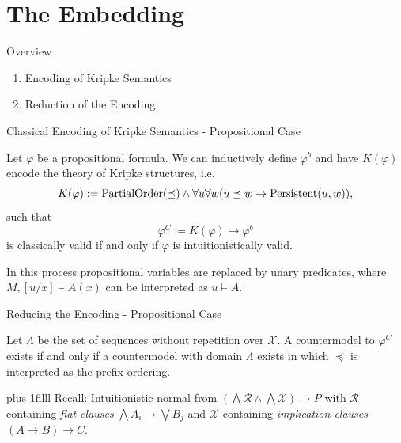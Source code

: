 \documentclass{cubeamer}
\newcommand{\btVFill}{\vskip0pt plus 1filll}
\begin{document}
	
	\section{The Embedding}
	
	\begin{frame}{Overview}
		\begin{enumerate}
			\item Encoding of Kripke Semantics
			\item Reduction of the Encoding
		\end{enumerate}
	\end{frame}

	\begin{frame}{Classical Encoding of Kripke Semantics - Propositional Case}
		\begin{lemma}
			Let $\varphi$ be a propositional formula.
		 	We can inductively define $\varphi^{b}$ 
			and have $K(\varphi)$ encode the theory of Kripke structures, i.e.
			\[K(\varphi) := \text{\normalfont PartialOrder}(\preceq)\wedge\forall u\forall w(u\preceq w\to \text{\normalfont Persistent}(u, w)),\]
			such that
			\[\varphi^{C} := K(\varphi)\to \varphi^{b}\]
		    is classically valid if and only if $\varphi$ is intuitionistically valid.
		\end{lemma}
		In this process propositional variables are replaced by unary predicates, where $M, [u/x]\models A(x)$ can be interpreted as $u\models A$.
	\end{frame}
	
	\begin{frame}{Reducing the Encoding - Propositional Case}
		\vspace*{.5cm}
		\begin{lemma}
			Let $\Lambda$ be the set of sequences without repetition over $\mathcal X$. A countermodel to $\varphi^C$ exists if and only if a countermodel with domain $\Lambda$ exists in which $\preceq$ is interpreted as the prefix ordering.
		\end{lemma}
		\btVFill
		Recall: Intuitionistic normal from $\left(\bigwedge\mathcal R\wedge\bigwedge\mathcal X\right)\to P$ with $\mathcal R$ containing  \emph{flat clauses} $\bigwedge A_i\to \bigvee B_j$ and $\mathcal X$ containing \emph{implication clauses} $(A\to B)\to C$.
	\end{frame}
\end{document}
